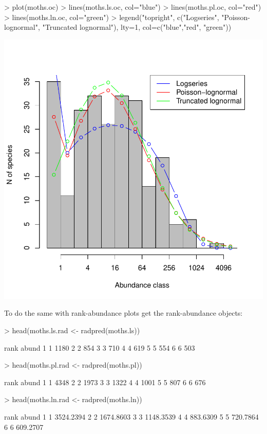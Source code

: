 \documentclass[11pt, A4]{article}
\begin{document}
\begin{Schunk}
\begin{Sinput}
> plot(moths.oc)
> lines(moths.ls.oc, col="blue")
> lines(moths.pl.oc, col="red")
> lines(moths.ln.oc, col="green")
> legend("topright", 
        c("Logseries", "Poisson-lognormal", "Truncated lognormal"), 
        lty=1, col=c("blue","red", "green"))
\end{Sinput}
\end{Schunk}
\includegraphics{sads_intro-woven-Octaves-plot}

To do the same with rank-abundance plots get the rank-abundance objects:

\begin{Schunk}
\begin{Sinput}
> head(moths.ls.rad <- radpred(moths.ls)) 
\end{Sinput}
\begin{Soutput}
  rank abund
1    1  1180
2    2   854
3    3   710
4    4   619
5    5   554
6    6   503
\end{Soutput}
\begin{Sinput}
> head(moths.pl.rad <- radpred(moths.pl))
\end{Sinput}
\begin{Soutput}
  rank abund
1    1  4348
2    2  1973
3    3  1322
4    4  1001
5    5   807
6    6   676
\end{Soutput}
\begin{Sinput}
> head(moths.ln.rad <- radpred(moths.ln))
\end{Sinput}
\begin{Soutput}
  rank     abund
1    1 3524.2394
2    2 1674.8603
3    3 1148.3539
4    4  883.6309
5    5  720.7864
6    6  609.2707
\end{Soutput}
\end{Schunk}
\end{document}
